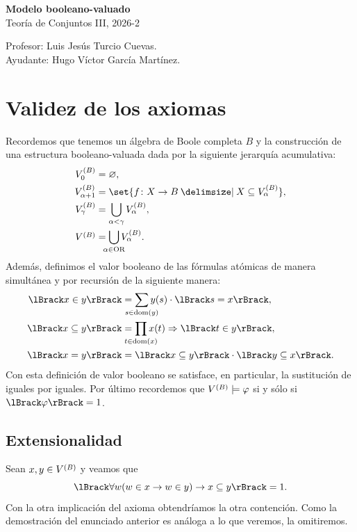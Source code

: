 \documentclass[letterpaper,DIV=15,12pt]{scrartcl}
\theoremstyle{manual}
\renewcommand{\emptyset}{\varnothing}
\DeclarePairedDelimiter{\vb}{\lBrack}{\rBrack}             %
\DeclareMathOperator{\dom}{dom}                            %
\newcommand{\st}{}
\newcommand{\SetSymbol}[1][]{%
\nonscript\:#1\vert
\allowbreak
\nonscript\:
\mathopen{}}
\renewcommand\st{\SetSymbol[\delimsize]}
\begin{document}
\thispagestyle{plain}

    \begin{center}
        {\fontsize{30}{60}\rmfamily \textbf{Modelo booleano-valuado}} \\ \vspace{.2cm} Teoría de Conjuntos III, 2026-2
    \end{center}
    \begin{flushright}
        \footnotesize \hfill Profesor: Luis Jesús Turcio Cuevas.\\
        \hfill Ayudante: Hugo Víctor García Martínez.
    \end{flushright}

\section{Validez de los axiomas}
Recordemos que tenemos un álgebra de Boole completa \(B\) y la construcción de
una estructura booleano-valuada dada por la siguiente jerarquía acumulativa:
\begin{align*}
  \mb[0] &=\emptyset,\\
  \mb[\alpha+1] &=\set{f\colon X\to B\st X\subseteq\mb[\alpha]},\\
  \mb[\gamma] &=\bigcup_{\alpha<\gamma}\mb[\alpha],\\
  \mb &=\smashoperator{\bigcup_{\alpha\in\text{OR}}}\mb[\alpha].
\end{align*}
Además, definimos el valor booleano de las fórmulas atómicas de manera
simultánea y por recursión de la siguiente manera:
\begin{align*}
  \vb{x\in y} &= \smashoperator{\sum_{s\in\dom(y)}}y(s)\cdot\vb{s=x},\\
  \vb{x\subseteq y} 
  &= \smashoperator{\prod_{t\in\dom(x)}}x(t)\Rightarrow\vb{t\in y},\\
  \vb{x=y} &= \vb{x\subseteq y}\cdot\vb{y\subseteq x}.
\end{align*}
Con esta definición de valor booleano se satisface, en particular, la
sustitución de iguales por iguales.
Por último recordemos que \(\mb\models\varphi\) si y sólo si \(\vb{\varphi}=1\).


\subsection{Extensionalidad}
Sean \(x,y\in\mb\) y veamos que
\begin{equation}
  \label{eq:ext}
  \vb{\forall w(w\in x\to w\in y)\to x\subseteq y}=1.
\end{equation}
Con la otra implicación del axioma obtendríamos la otra contención. Como la
demostración del enunciado anterior es análoga a lo que veremos, la omitiremos.
\end{document}
